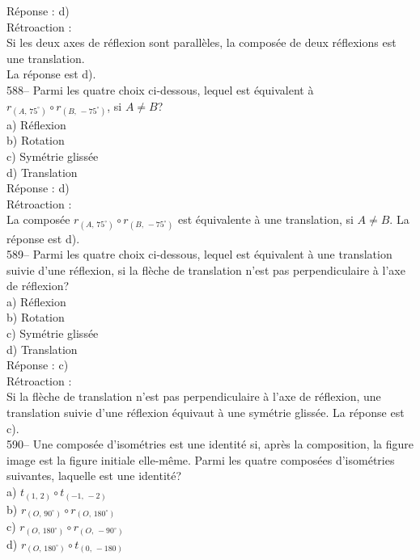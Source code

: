 ﻿\documentclass[letterpaper, 12pt]{article}
\begin{document}
R\'eponse : d) \\

R\'etroaction : \\
Si les deux axes de r\'eflexion sont parall\`eles, la compos\'ee de deux
r\'eflexions est une translation.\\
La r\'eponse est d).\\

588-- Parmi les quatre choix ci-dessous, lequel est \'equivalent \`a
$r_{\left(A,\,75^{\circ}\right)} \circ r_{\left(B,\,-75^{\circ}\right) }$,
si $A\neq B$?\\
a) R\'eflexion\\
b) Rotation\\
c) Sym\'etrie gliss\'ee\\
d) Translation\\

R\'eponse : d)\\

R\'etroaction : \\
La compos\'ee $r_{\left(A,\,75^{\circ}\right)} \circ
r_{\left(B,\,-75^{\circ}\right) }$ est \'equivalente \`a une translation, si
$A\neq B$.  La r\'eponse est d).\\

589-- Parmi les quatre choix ci-dessous, lequel est \'equivalent \`a une
translation suivie d'une r\'eflexion, si la fl\`eche de translation n'est
pas perpendiculaire \`a l'axe de r\'eflexion?\\
a) R\'eflexion\\
b) Rotation\\
c) Sym\'etrie gliss\'ee\\
d) Translation\\

R\'eponse : c)\\

R\'etroaction : \\
Si la fl\`eche de translation n'est pas perpendiculaire \`a l'axe de
r\'eflexion, une translation suivie d'une r\'eflexion  \'equivaut \`a une
sym\'etrie gliss\'ee.  La r\'eponse est c).\\

590-- Une compos\'ee d'isom\'etries est une identit\'e si, apr\`es la
composition, la figure image est la figure initiale elle-m\^eme.  Parmi les
quatre compos\'ees d'isom\'etries suivantes, laquelle est une identit\'e?\\
a) $t_{\left(1,\,2\right) } \circ t_{\left(-1,\,-2\right) } $\\
b) $r_{\left(O,\,90^{\circ}\right)} \circ r_{\left(O,\,180^{\circ}\right)}
$\\
c) $r_{\left(O,\,180^{\circ}\right)} \circ r_{\left(O,\,-90^{\circ}\right)}
$\\
d) $r_{\left(O,\,180^{\circ}\right)} \circ t_{\left(0,\,-180\right)} $   \\
\end{document}
